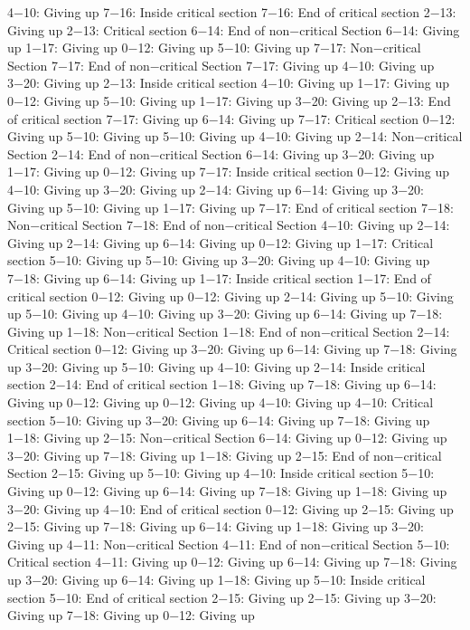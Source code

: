 4−10: Giving up
7−16: Inside critical section
7−16: End of critical section
2−13: Giving up
2−13: Critical section
6−14: End of non−critical Section
6−14: Giving up
1−17: Giving up
0−12: Giving up
5−10: Giving up
7−17: Non−critical Section
7−17: End of non−critical Section
7−17: Giving up
4−10: Giving up
3−20: Giving up
2−13: Inside critical section
4−10: Giving up
1−17: Giving up
0−12: Giving up
5−10: Giving up
1−17: Giving up
3−20: Giving up
2−13: End of critical section
7−17: Giving up
6−14: Giving up
7−17: Critical section
0−12: Giving up
5−10: Giving up
5−10: Giving up
4−10: Giving up
2−14: Non−critical Section
2−14: End of non−critical Section
6−14: Giving up
3−20: Giving up
1−17: Giving up
0−12: Giving up
7−17: Inside critical section
0−12: Giving up
4−10: Giving up
3−20: Giving up
2−14: Giving up
6−14: Giving up
3−20: Giving up
5−10: Giving up
1−17: Giving up
7−17: End of critical section
7−18: Non−critical Section
7−18: End of non−critical Section
4−10: Giving up
2−14: Giving up
2−14: Giving up
6−14: Giving up
0−12: Giving up
1−17: Critical section
5−10: Giving up
5−10: Giving up
3−20: Giving up
4−10: Giving up
7−18: Giving up
6−14: Giving up
1−17: Inside critical section
1−17: End of critical section
0−12: Giving up
0−12: Giving up
2−14: Giving up
5−10: Giving up
5−10: Giving up
4−10: Giving up
3−20: Giving up
6−14: Giving up
7−18: Giving up
1−18: Non−critical Section
1−18: End of non−critical Section
2−14: Critical section
0−12: Giving up
3−20: Giving up
6−14: Giving up
7−18: Giving up
3−20: Giving up
5−10: Giving up
4−10: Giving up
2−14: Inside critical section
2−14: End of critical section
1−18: Giving up
7−18: Giving up
6−14: Giving up
0−12: Giving up
0−12: Giving up
4−10: Giving up
4−10: Critical section
5−10: Giving up
3−20: Giving up
6−14: Giving up
7−18: Giving up
1−18: Giving up
2−15: Non−critical Section
6−14: Giving up
0−12: Giving up
3−20: Giving up
7−18: Giving up
1−18: Giving up
2−15: End of non−critical Section
2−15: Giving up
5−10: Giving up
4−10: Inside critical section
5−10: Giving up
0−12: Giving up
6−14: Giving up
7−18: Giving up
1−18: Giving up
3−20: Giving up
4−10: End of critical section
0−12: Giving up
2−15: Giving up
2−15: Giving up
7−18: Giving up
6−14: Giving up
1−18: Giving up
3−20: Giving up
4−11: Non−critical Section
4−11: End of non−critical Section
5−10: Critical section
4−11: Giving up
0−12: Giving up
6−14: Giving up
7−18: Giving up
3−20: Giving up
6−14: Giving up
1−18: Giving up
5−10: Inside critical section
5−10: End of critical section
2−15: Giving up
2−15: Giving up
3−20: Giving up
7−18: Giving up
0−12: Giving up
